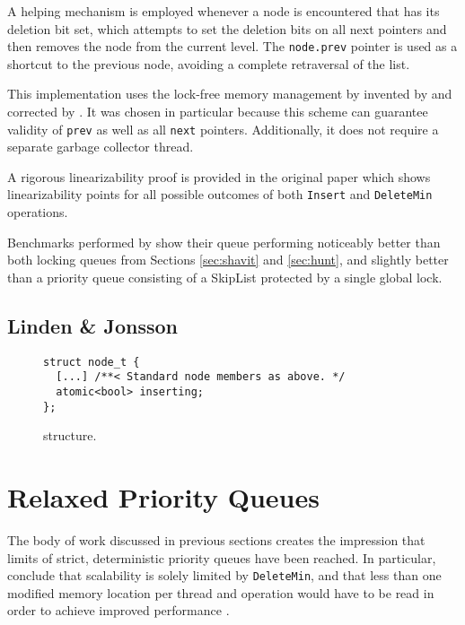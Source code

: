 \documentclass[a4paper,10pt]{article}
\begin{document}
A helping mechanism is employed whenever a node is encountered that has its deletion bit set, which attempts
to set the deletion bits on all next pointers and then removes the node from the current level. The
\lstinline|node.prev| pointer is used as a shortcut to the previous node, avoiding a complete retraversal
of the list.

This implementation uses the lock-free memory management by invented by \citeauthor{valois1996lock}
\cite{valois1995lock,valois1996lock} and corrected by \citeauthor{michael1995correction} 
\cite{michael1995correction}. It was chosen in particular because this scheme can guarantee validity
of \lstinline|prev| as well as all \lstinline|next| pointers. Additionally, it does not require a separate
garbage collector thread.

A rigorous linearizability proof is provided in the original paper \cite{sundell2003fast} which shows
linearizability points for all possible outcomes of both \lstinline|Insert| and \lstinline|DeleteMin|
operations.


Benchmarks performed by \citeauthor{sundell2003fast} show their queue performing noticeably better than both locking 
queues from Sections \ref{sec:shavit} and \ref{sec:hunt}, and slightly better than a priority queue
consisting of a SkipList protected by a single global lock.

\subsection{Linden \& Jonsson} \label{sec:linden}

\begin{figure}[h]
\begin{lstlisting}
struct node_t {
  [...] /**< Standard node members as above. */
  atomic<bool> inserting;
};
\end{lstlisting}
\caption{\citeauthor{linden2013skiplist} structure.}
\label{fig:lindensl}
\end{figure}


\section{Relaxed Priority Queues}

The body of work discussed in previous sections
creates the impression that limits of strict, deterministic priority queues have been reached.
In particular, \citeauthor{} conclude that scalability is solely limited by \lstinline|DeleteMin|,
and that less than one modified memory location per thread and operation would have to be read
in order to achieve improved performance \cite{}. %
\end{document}
